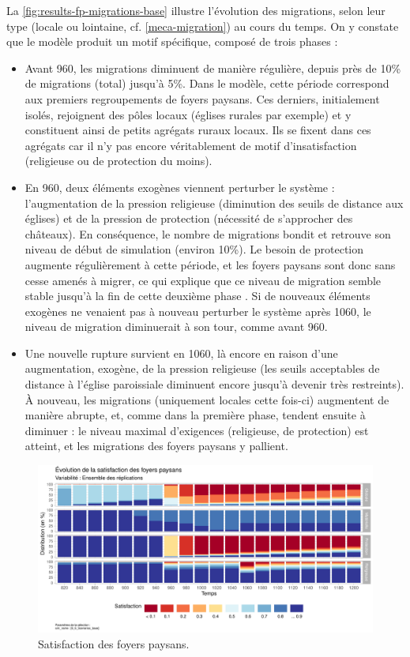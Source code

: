 La \cref{fig:results-fp-migrations-base} illustre l'évolution des migrations, selon leur type (locale ou lointaine, cf. \cref{meca-migration}) au cours du temps.
On y constate que le modèle produit un motif spécifique, composé de trois phases :
\begin{itemize}
	\item Avant 960, les migrations diminuent de manière régulière, depuis près de 10\% de migrations (total) jusqu'à 5\%.
	Dans le modèle, cette période correspond aux premiers regroupements de foyers paysans.
	Ces derniers, initialement isolés, rejoignent des pôles locaux (églises rurales par exemple) et y constituent ainsi de petits agrégats ruraux locaux.
	Ils se fixent dans ces agrégats car il n'y pas encore véritablement de motif d'insatisfaction (religieuse ou de protection du moins).
	\item En 960, deux éléments exogènes viennent perturber le système : l'augmentation de la pression religieuse (diminution des seuils de distance aux églises) et de la pression de protection (nécessité de s'approcher des châteaux).
	En conséquence, le nombre de migrations bondit et retrouve son niveau de début de simulation (environ 10\%).
	Le besoin de protection augmente régulièrement à cette période, et les foyers paysans sont donc sans cesse amenés à migrer, ce qui explique que ce niveau de migration semble stable jusqu'à la fin de cette deuxième phase%
		. Si de nouveaux éléments exogènes ne venaient pas à nouveau perturber le système après 1060, le niveau de migration diminuerait à son tour, comme avant 960.
	\item Une nouvelle rupture survient en 1060, là encore en raison d'une augmentation, exogène, de la pression religieuse (les seuils acceptables de distance à l'église paroissiale diminuent encore jusqu'à devenir très restreints).
	À nouveau, les migrations (uniquement locales cette fois-ci) augmentent de manière abrupte, et, comme dans la première phase, tendent ensuite à diminuer : le niveau maximal d'exigences (religieuse, de protection) est atteint, et les migrations des foyers paysans y pallient.
\end{itemize}

\begin{figure}[H]
	\centering
	\includegraphics[width=\linewidth]{img/results_6_6/FP_Satisfaction_Haut.pdf}
	\caption{Satisfaction des foyers paysans.}
	\label{fig:results-fp-satisfaction}
\end{figure}

